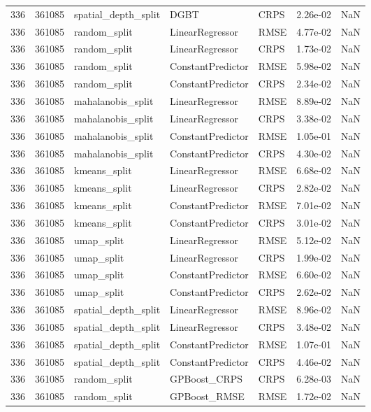 \begin{tabular}{rrlllrr}
336 & 361085 & spatial\_depth\_split & DGBT & CRPS & 2.26e-02 & NaN \\
336 & 361085 & random\_split & LinearRegressor & RMSE & 4.77e-02 & NaN \\
336 & 361085 & random\_split & LinearRegressor & CRPS & 1.73e-02 & NaN \\
336 & 361085 & random\_split & ConstantPredictor & RMSE & 5.98e-02 & NaN \\
336 & 361085 & random\_split & ConstantPredictor & CRPS & 2.34e-02 & NaN \\
336 & 361085 & mahalanobis\_split & LinearRegressor & RMSE & 8.89e-02 & NaN \\
336 & 361085 & mahalanobis\_split & LinearRegressor & CRPS & 3.38e-02 & NaN \\
336 & 361085 & mahalanobis\_split & ConstantPredictor & RMSE & 1.05e-01 & NaN \\
336 & 361085 & mahalanobis\_split & ConstantPredictor & CRPS & 4.30e-02 & NaN \\
336 & 361085 & kmeans\_split & LinearRegressor & RMSE & 6.68e-02 & NaN \\
336 & 361085 & kmeans\_split & LinearRegressor & CRPS & 2.82e-02 & NaN \\
336 & 361085 & kmeans\_split & ConstantPredictor & RMSE & 7.01e-02 & NaN \\
336 & 361085 & kmeans\_split & ConstantPredictor & CRPS & 3.01e-02 & NaN \\
336 & 361085 & umap\_split & LinearRegressor & RMSE & 5.12e-02 & NaN \\
336 & 361085 & umap\_split & LinearRegressor & CRPS & 1.99e-02 & NaN \\
336 & 361085 & umap\_split & ConstantPredictor & RMSE & 6.60e-02 & NaN \\
336 & 361085 & umap\_split & ConstantPredictor & CRPS & 2.62e-02 & NaN \\
336 & 361085 & spatial\_depth\_split & LinearRegressor & RMSE & 8.96e-02 & NaN \\
336 & 361085 & spatial\_depth\_split & LinearRegressor & CRPS & 3.48e-02 & NaN \\
336 & 361085 & spatial\_depth\_split & ConstantPredictor & RMSE & 1.07e-01 & NaN \\
336 & 361085 & spatial\_depth\_split & ConstantPredictor & CRPS & 4.46e-02 & NaN \\
336 & 361085 & random\_split & GPBoost\_CRPS & CRPS & 6.28e-03 & NaN \\
336 & 361085 & random\_split & GPBoost\_RMSE & RMSE & 1.72e-02 & NaN \\

\end{tabular}
